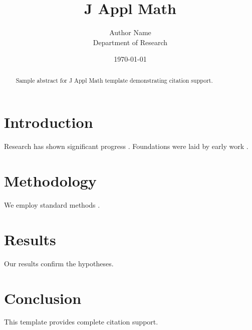 \documentclass{annals}
\title{J Appl Math}
\author{Author Name \\ \small Department of Research}
\date{\today}
\begin{document}
\maketitle

\begin{abstract}
Sample abstract for J Appl Math template demonstrating citation support.
\end{abstract}

\section{Introduction}
Research has shown significant progress \citep{einstein1905}. Foundations were laid by early work \citep{turing1950}.

\section{Methodology}
We employ standard methods \citep{knuth1984}.

\section{Results}
Our results confirm the hypotheses.

\section{Conclusion}
This template provides complete citation support.



\end{document}
